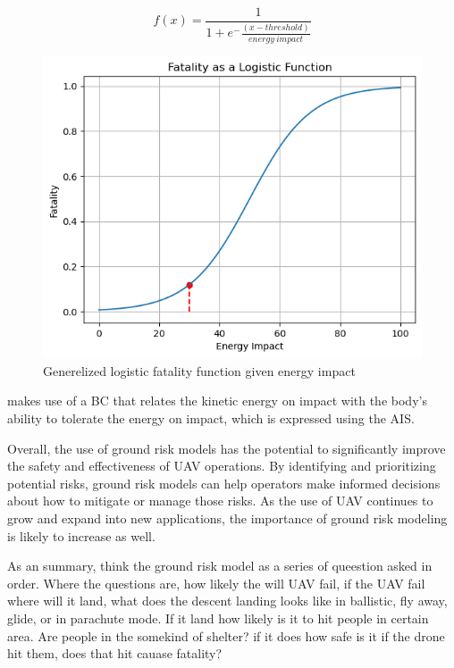 \documentclass[12pt]{report}
\begin{document}
            \begin{equation}
                f(x) = \frac{1}{1+e^-\frac{(x-threshold)}{energy \ impact}}
            \end{equation}

            \begin{figure}[H]
                \centering
                \includegraphics[width=\textwidth]{Plot/logistic_bounded.png}
                \caption{Generelized logistic fatality function given energy impact}
            \end{figure}


            \cite{magister_small_2010} makes use of a \ac{BC} that relates the kinetic energy on impact with the body's ability to
            tolerate the energy on impact, which is expressed using the \ac{AIS}.

        Overall, the use of ground risk models has the potential to significantly improve the safety and
        effectiveness of UAV operations. By identifying and prioritizing potential risks, ground risk models can help
        operators make informed decisions about how to mitigate or manage those risks. As the use of UAV continues to
        grow and expand into new applications, the importance of ground risk modeling is likely to increase as well.

        As an summary, think the ground risk model as a series of queestion asked in order. Where the questions are, how
        likely the will UAV fail, if the UAV fail where will it land, what does the descent landing looks like in
        ballistic, fly away, glide, or in parachute mode. If it land how likely is it to hit people in certain area. Are
        people in the somekind of shelter? if it does how safe is it if the drone hit them, does that hit cauase
        fatality?
        
\end{document}
